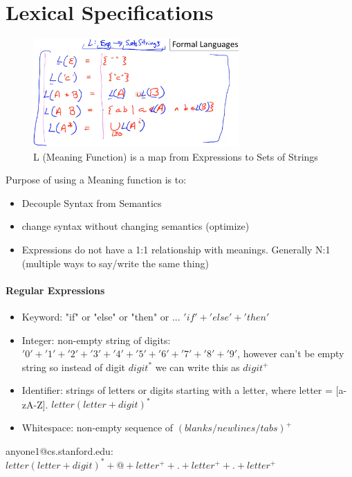 \documentclass[a4paper, 10pt]{article}
\begin{document}
\section{Lexical Specifications}
\begin{figure}[ht]
	\centering
	\includegraphics[width=0.7\textwidth]{intro.formalLanguages.png}
	\caption{L (Meaning Function) is a map from Expressions to Sets of Strings}
\end{figure}
Purpose of using a Meaning function is to:
\begin{itemize}
	\item Decouple Syntax from Semantics
	\item change syntax without changing semantics (optimize)
	\item Expressions do not have a 1:1 relationship with meanings. Generally N:1 (multiple ways to say/write the same thing)
\end{itemize}
\paragraph{Regular Expressions}
\begin{itemize}
	\item Keyword: "if" or "else" or "then" or ... $'if' + 'else' + 'then'$
	\item Integer: non-empty string of digits: $'0' + '1' + '2' + '3' + '4' + '5' + '6' + '7' + '8' + '9'$, however can't be empty string so instead of digit $digit^*$ we can write this as $digit^+$
	\item Identifier: strings of letters or digits starting with a letter, where letter = [a-zA-Z]. $letter(letter + digit)^*$
	\item Whitespace: non-empty sequence of $(blanks/newlines/tabs)^+$
\end{itemize}
anyone1@cs.stanford.edu: $letter(letter + digit)^* + @ + letter^+ + . + letter^+ + . + letter^+$
\end{document}
